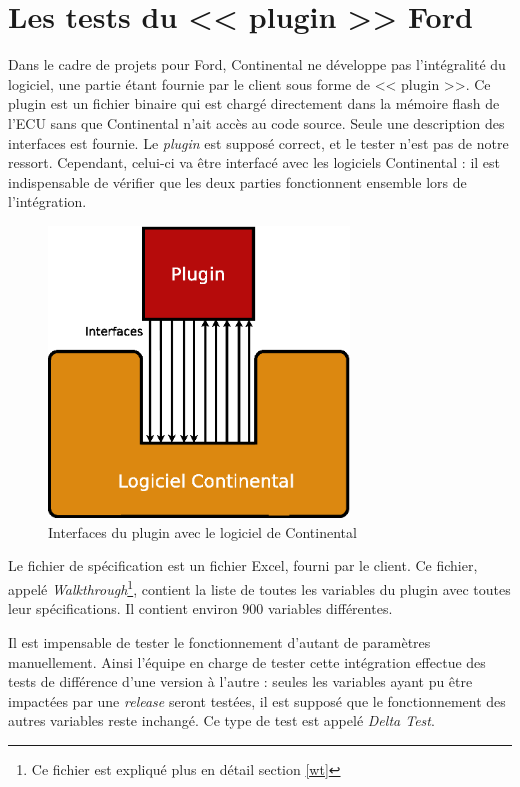 	\section{Les tests du << plugin >> Ford}\label{plugin}
	Dans le cadre de projets pour Ford, Continental ne développe pas l'intégralité du logiciel, une partie étant fournie par le client sous forme de << plugin >>. Ce plugin est un fichier binaire qui est chargé directement dans la mémoire flash de l'ECU sans que Continental n'ait accès au code source. Seule une description des interfaces est fournie. Le \textit{plugin} est supposé correct, et le tester n'est pas de notre ressort. Cependant, celui-ci va être interfacé avec les logiciels Continental : il est indispensable de vérifier que les deux parties fonctionnent ensemble lors de l'intégration.
	\begin{figure}[H]
		\centering
		\includegraphics[width=8.0cm]{contents/images/plugin.eps}
		\caption{Interfaces du plugin avec le logiciel de Continental}
		\label{fig:plugin}	
	\end{figure}
	
	Le fichier de spécification est un fichier Excel, fourni par le client. Ce fichier, appelé \textit{Walkthrough}\footnote{Ce fichier est expliqué plus en détail section \ref{wt}}, 
	contient la liste de toutes les variables du plugin avec toutes leur spécifications. Il contient
	environ 900 variables différentes. 
	
	Il est impensable de tester le fonctionnement d'autant de paramètres manuellement. Ainsi l'équipe en
	charge de tester cette intégration effectue des tests de différence d'une version à l'autre : seules les variables ayant pu être impactées par une \textit{release} seront testées, il est supposé que le fonctionnement des autres variables reste inchangé. Ce type de test est appelé \textit{Delta Test}.
	
